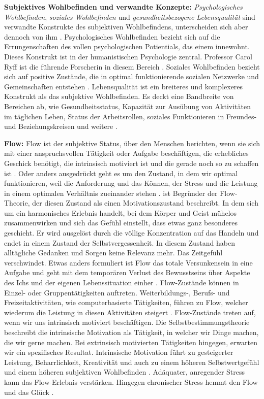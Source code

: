 \par
\textbf{Subjektives Wohlbefinden und verwandte Konzepte:} \textit{Psychologisches Wohlbefinden}, \textit{soziales Wohlbefinden} und \textit{gesundheitsbezogene Lebensqualität} sind verwandte Konstrukte des subjektiven Wohlbefindens, unterscheiden sich aber dennoch von ihm \cite{Carr2011}. Psychologisches Wohlbefinden bezieht sich auf die Errungenschaften des vollen psychologischen Potientials, das einem innewohnt. Dieses Konstrukt ist in der humanistischen Psychologie zentral. Professor Carol Ryff ist die führende Forscherin in diesem Bereich \cite{Ryff1989}. Soziales Wohlbefinden bezieht sich auf positive Zustände, die in optimal funktionierende sozialen Netzwerke und Gemeinschaften entstehen \cite{Keyes1998}. Lebensqualität ist ein breiteres und komplexeres Konstrukt als das subjektive Wohlbefinden. Es deckt eine Bandbreite von Bereichen ab, wie Gesundheitsstatus, Kapazität zur Ausübung von Aktivitäten im täglichen Leben, Status der Arbeitsrollen, soziales Funktionieren in Freundes- und Beziehungskreisen und weitere \cite{Preedy2010}. 
\par
\textbf{Flow:}
Flow ist der subjektive Status, über den Menschen berichten, wenn sie sich mit einer anspruchsvollen Tätigkeit oder Aufgabe beschäftigen, die erhebliches Geschick benötigt, die intrinsisch motiviert ist und die gerade noch so zu schaffen ist \cite{Nakamura2009}. Oder anders ausgedrückt geht es um den Zustand, in dem wir optimal funktionieren, weil die Anforderung und das Können, der Stress und die Leistung in einem optimalen Verhältnis zueinander stehen \cite{Esch2014}.  ist Begründer der Flow-Theorie, der diesen Zustand als einen Motivationszustand beschreibt. In dem sich um ein harmonisches Erlebnis handelt, bei dem Körper und Geist mühelos zusammenwirken und sich das Gefühl einstellt, dass etwas ganz besonderes geschieht. Er wird ausgelöst durch die völlige Konzentration auf das Handeln und endet in einem Zustand der Selbstvergessenheit. In diesem Zustand haben alltägliche Gedanken und Sorgen keine Relevanz mehr. Das Zeitgefühl verschwindet. Etwas anders formuliert ist Flow das totale Versunkensein in eine Aufgabe und geht mit dem temporären Verlust des Bewusstseins über Aspekte des Ichs und der eigenen Lebenssituation einher \cite{Nakamura2009}. Flow-Zustände können in Einzel- oder Gruppentätigkeiten auftreten. Weiterbildungs-, Berufs- und Freizeitaktivitäten, wie computerbasierte Tätigkeiten, führen zu Flow, welcher wiederum die Leistung in diesen Aktivitäten steigert \cite{Carr2011}. Flow-Zustände treten auf, wenn wir uns intrinsisch motiviert beschäftigen. Die Selbstbestimmungstheorie beschreibt die intrinsische Motivation als Tätigkeit, in welcher wir Dinge machen, die wir gerne machen. Bei extrinsisch motivierten Tätigkeiten hingegen, erwarten wir ein spezifisches Resultat. Intrinsische Motivation führt zu gesteigerter Leistung, Beharrlichkeit, Kreativität und auch zu einem höheren Selbstwertgefühl und einem höheren subjektiven Wohlbefinden \cite{Deci1985}. Adäquater, anregender Stress kann das Flow-Erlebnis verstärken. Hingegen chronischer Stress hemmt den Flow und das Glück \cite{Esch2014}.
